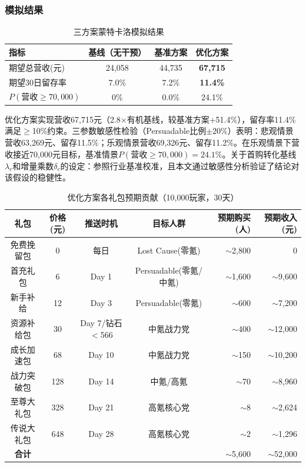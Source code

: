 \subsubsection{模拟结果}

\begin{table}[H]
\centering
\caption{三方案蒙特卡洛模拟结果}
\label{tab:mc_results}
\small
\begin{tabular}{l|c|c|c}
\toprule
\textbf{指标} & \textbf{基线（无干预）} & \textbf{基准方案} & \textbf{优化方案} \\
\midrule
期望总营收(元) & 24,058 & 44,735 & \textbf{67,715} \\
期望30日留存率 & 7.0\% & 7.2\% & \textbf{11.4\%} \\
$P(\text{营收}\geq70,000)$ & 0\% & 0.0\% & 24.1\% \\
\bottomrule
\end{tabular}
\end{table}

优化方案实现营收67,715元（2.8$\times$有机基线，较基准方案+51.4\%），留存率11.4\%满足$\geq$10\%约束。三参数敏感性检验（Persuadable比例$\pm20\%$）表明：悲观情景营收63,269元、留存11.5\%；乐观情景营收69,326元、留存11.2\%。在乐观情景下营收接近70,000元目标，基准情景$P(\text{营收}\geq70,000)=24.1\%$。关于首购转化基线$\lambda_c$和增量乘数$\delta_c$的设定：参照行业基准校准，且本文通过敏感性分析验证了结论对该假设的稳健性。
\begin{table}[H]
\centering
\caption{优化方案各礼包预期贡献（10,000玩家，30天）}
\label{tab:pack_contrib}
\small
\begin{tabular}{c|c|c|c|r|r}
\toprule
\textbf{礼包} & \textbf{价格(元)} & \textbf{推送时机} & \textbf{目标人群} & \textbf{预期购买(人)} & \textbf{预期收入(元)} \\
\midrule
免费挽留包 & 0 & 每日 & Lost Cause(零氪) & $\sim$2,800 & 0 \\
首充礼包 & 6 & Day 1 & Persuadable(零氪/中氪) & $\sim$1,600 & $\sim$9,600 \\
新手补给 & 12 & Day 3 & Persuadable(零氪) & $\sim$600 & $\sim$7,200 \\
资源补给包 & 30 & Day 7/钻石$<$566 & 中氪战力党 & $\sim$400 & $\sim$12,000 \\
成长加速包 & 68 & Day 10 & 中氪战力党 & $\sim$150 & $\sim$10,200 \\
战力突破包 & 128 & Day 14 & 中氪/高氪 & $\sim$70 & $\sim$8,960 \\
至尊大礼包 & 328 & Day 21 & 高氪核心党 & $\sim$8 & $\sim$2,624 \\
传说大礼包 & 648 & Day 28 & 高氪核心党 & $\sim$2 & $\sim$1,296 \\
\midrule
\textbf{合计} & & & & $\sim$5,600 & $\sim$52,000 \\
\bottomrule
\end{tabular}
\end{table}

